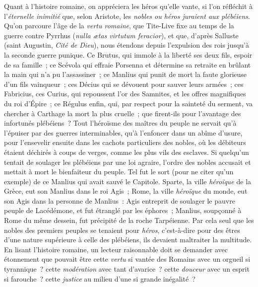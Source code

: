 \documentclass[french,twoside]{book} %
\begin{document}
Quant à l’histoire romaine, on appréciera les héros qu’elle vante, si l’on réfléchit à l’\emph{{\itshape éternelle inimitié}} que, selon Aristote, les \emph{{\itshape nobles ou héros juraient aux plébéiens}}. Qu’on parcoure l’âge de la {\itshape vertu romaine}, que Tite-Live fixe au temps de la guerre contre Pyrrhus (\emph{{\itshape nulla ætas virtutum feracior}}), et que, d’après Salluste (saint Augustin, {\itshape Cité de Dieu}), nous étendons depuis l’expulsion des rois jusqu’à la seconde guerre punique. Ce Brutus, qui immole à la liberté ses deux fils, espoir de sa famille ; ce Scévola qui effraie Porsenna et détermine sa retraite en brûlant la main qui n’a pu l’assassiner ; ce Manlius qui punit de mort la faute glorieuse d’un fils vainqueur ; ces Décius qui se dévouent pour sauver leurs armées ; ces Fabricius, ces Curius, qui repoussent  l’or des Samnites, et les offres magnifiques du roi d’Épire ; ce Régulus enfin, qui, par respect pour la sainteté du serment, va chercher à Carthage la mort la plus cruelle ; que firent-ils pour l’avantage des infortunés plébéiens ? Tout l’héroïsme des maîtres du peuple ne servait qu’à l’épuiser par des guerres interminables, qu’à l’enfoncer dans un abîme d’usure, pour l’ensevelir ensuite dans les cachots particuliers des nobles, où les débiteurs étaient déchirés à coups de verges, comme les plus vils des esclaves. Si quelqu’un tentait de soulager les plébéiens par une loi agraire, l’ordre des nobles accusait et mettait à mort le bienfaiteur du peuple. Tel fut le sort (pour ne citer qu’un exemple) de ce Manlius qui avait sauvé le Capitole. Sparte, la ville {\itshape héroïque} de la Grèce, eut son Manlius dans le roi Agis ; Rome, la ville {\itshape héroïque} du monde, eut son Agis dans la personne de Manlius : Agis entreprit de soulager le pauvre peuple de Lacédémone, et fut étranglé par les éphores ; Manlius, soupçonné à Rome du même dessein, fut précipité de la roche Tarpéienne. Par cela seul que les nobles des premiers peuples se tenaient pour {\itshape héros}, c’est-à-dire pour des êtres d’une nature supérieure à celle des plébéiens, ils devaient maltraiter la multitude. En lisant l’histoire romaine, un lecteur raisonnable doit se demander avec étonnement que pouvait être cette {\itshape vertu} si vantée des Romains avec un orgueil si tyrannique ? cette {\itshape modération} avec tant d’avarice ? cette {\itshape douceur} avec un esprit si farouche ?  cette {\itshape justice} au milieu d’une si grande inégalité ?\par
\end{document}
